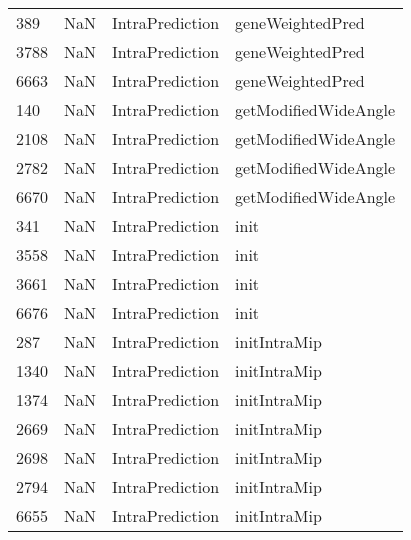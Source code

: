 \begin{tabular}{llll}
389  &                   NaN &            IntraPrediction &                          geneWeightedPred \\
3788 &                   NaN &            IntraPrediction &                          geneWeightedPred \\
6663 &                   NaN &            IntraPrediction &                          geneWeightedPred \\
140  &                   NaN &            IntraPrediction &                      getModifiedWideAngle \\
2108 &                   NaN &            IntraPrediction &                      getModifiedWideAngle \\
2782 &                   NaN &            IntraPrediction &                      getModifiedWideAngle \\
6670 &                   NaN &            IntraPrediction &                      getModifiedWideAngle \\
341  &                   NaN &            IntraPrediction &                                      init \\
3558 &                   NaN &            IntraPrediction &                                      init \\
3661 &                   NaN &            IntraPrediction &                                      init \\
6676 &                   NaN &            IntraPrediction &                                      init \\
287  &                   NaN &            IntraPrediction &                              initIntraMip \\
1340 &                   NaN &            IntraPrediction &                              initIntraMip \\
1374 &                   NaN &            IntraPrediction &                              initIntraMip \\
2669 &                   NaN &            IntraPrediction &                              initIntraMip \\
2698 &                   NaN &            IntraPrediction &                              initIntraMip \\
2794 &                   NaN &            IntraPrediction &                              initIntraMip \\
6655 &                   NaN &            IntraPrediction &                              initIntraMip \\

\end{tabular}

